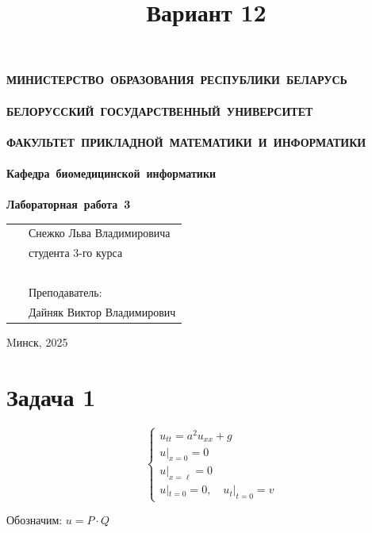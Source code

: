 \documentclass[a4paper,12pt]{article}
\begin{document}
\setcounter{page}{1}
\thispagestyle{empty}
\begin{center}
\bf
\vspace{4cm}
{
\mbox{МИНИСТЕРСТВО~ОБРАЗОВАНИЯ~РЕСПУБЛИКИ~БЕЛАРУСЬ} \\~\\
\mbox{БЕЛОРУССКИЙ~ГОСУДАРСТВЕННЫЙ~УНИВЕРСИТЕТ} \\~\\
\mbox{ФАКУЛЬТЕТ ПРИКЛАДНОЙ МАТЕМАТИКИ И ИНФОРМАТИКИ} \\~\\
\mbox{Кафедра~биомедицинской~информатики} \\~\\
}
\vspace{4cm}
\bf
\mbox{Лабораторная работа 3}\\
\vspace{1cm}
\vspace{3cm}
\end{center}
\begin{tabular}{ll}
\hspace{10.5cm}
&Снежко Льва Владимировича~\\
&студента 3-го курса\\~\\
&Преподаватель:\\
&Дайняк Виктор Владимирович
\end{tabular}
\vspace{7cm}
\begin{center}
Mинск, 2025
\end{center}
\clearpage
\restoregeometry
\title{Вариант 12}
\date{}
\maketitle

\section{Задача 1}

\[
\quad
\begin{cases}
u_{tt} = a^2 u_{xx} + g \\
u|_{x=0} = 0 \\
u|_{x=\ell} = 0 \\
u|_{t=0} = 0, \quad u_t|_{t=0} = v
\end{cases}
\]

Обозначим: \( u = P \cdot Q \)
\end{document}
